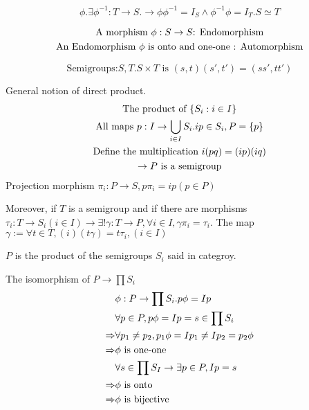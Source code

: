 \begin{Def}[Isomorphism]
    \[
        \phi. \exists \phi^{-1}: T \rightarrow S. \rightarrow
        \phi\phi^{-1}=I_S \wedge \phi^{-1}\phi=I_T. S \simeq T
    \]
\end{Def}

\begin{Def}
    \begin{gather*}
        \text{A morphism } \phi: S \rightarrow S    \text{: Endomorphism}\\
        \text{An Endomorphism } \phi \text{ is onto and one-one \text{: Automorphism}}
    \end{gather*}
\end{Def}

\begin{Def}
    \[\text{Semigroups:}S,T. S\times T \text{ is } (s,t)(s',t')=(ss',tt')\]

    General notion of direct product.
    \begin{gather*}
        \text{The product of } \{S_i:i\in I\}   \\
        \text{All maps } p: I \rightarrow \bigcup _{i \in I} S_i. ip\in S_i, P=\{p\}  \\
        \text{Define the multiplication }i(pq)=(ip)(iq) \\
        \rightarrow P \text{\space is a semigroup}
    \end{gather*}
    Projection morphism
    $\pi_i:P \rightarrow S, p\pi_i=ip(p \in P)$
    
    Moreover, if $T$ is a semigroup and if there are morphisms $\tau_i:T\rightarrow S_i(i \in I) \rightarrow \exists !\gamma: T \rightarrow P, \forall i\in I,\gamma \pi_i=\tau_i$. The map $\gamma:= \forall t \in T, (i)(t\gamma)=t\tau_i,(i \in I)$

    $P$ is the product of the semigroups $S_i$ said in categroy.
    \begin{Prof} The isomorphism of $P \to \prod S_i$
        \begin{align*}
            & \phi: P \to \prod S_i. p \phi =I p    \\
            & \forall p \in P, p \phi = I p = s \in \prod S_i \\
            \Rightarrow & \forall p_1 \neq p_2, p_1 \phi = I p_1 \neq I p_2 = p_2 \phi  \\
            \Rightarrow & \phi \text{\space is one-one} \\
            & \forall s \in \prod S_I \rightarrow \exists p \in P, I p = s  \\
            \Rightarrow & \phi \text{\space is onto}    \\
            \Rightarrow & \phi \text{\space is bijective}
        \end{align*}
    \end{Prof}
\end{Def}

